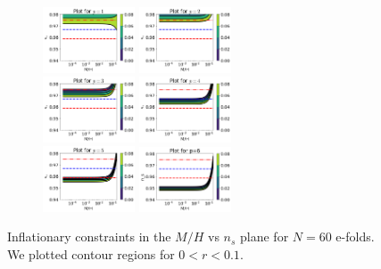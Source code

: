 \documentclass[amssymb,twocolumn,prd,nofootinbib,showpacs]{revtex4-1}
\begin{document}
\begin{figure}[h!]
\label{curv50}
\begin{subfigure}[b]{0.6\textwidth}
\includegraphics[width=0.3\textwidth]{p160.png}
\includegraphics[width=0.3\textwidth]{p260.png}\\ \includegraphics[width=0.3\textwidth]{p360.png}
\includegraphics[width=0.3\textwidth]{p460.png}\\
\includegraphics[width=0.3\textwidth]{p560.png}
\includegraphics[width=0.3\textwidth]{p660.png}
\end{subfigure}
\caption{Inflationary constraints in the $M/H$ vs $n_s$ plane for $N=60$ e-folds. We plotted contour regions for $0<r<0.1$.}\label{curv60}

\end{figure}
\end{document}
